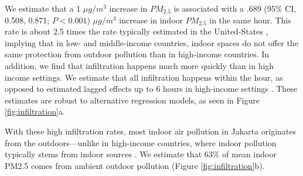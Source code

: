 \documentclass[reqno,12pt,notitlepage]{article}
\begin{document}
We estimate that a 1 $\mu g /m^{3}$ increase in $PM_{2.5}$ is associated with a .689 (95\% CI, 0.508, 0.871; $P < 0.001$) $\mu g /m^{3}$ increase in indoor $PM_{2.5}$ in the same hour. This rate is about 2.5 times the rate typically estimated in the United-States \citep{lunderberg_assessing_2023}, implying that in low- and middle-income countries, indoor spaces do not offer the same protection from outdoor pollution than in high-income countries. In addition, we find that infiltration happens much more quickly than in high income settings. We estimate that all infiltration happens within the hour, as opposed to estimated lagged effects up to 6 hours in high-income settings \citep{burke_exposures_2022, lunderberg_assessing_2023}. These estimates are robust to alternative regression models, as seen in Figure \ref{fig:infiltration}a. 

With these high infiltration rates, most indoor air pollution in Jakarta originates from the outdoors—unlike in high-income countries, where indoor pollution typically stems from indoor sources \citep{metcalfe_making_2025}. We estimate that 63\% of mean indoor PM2.5 comes from ambient outdoor pollution (Figure \ref{fig:infiltration}b).
\end{document}
